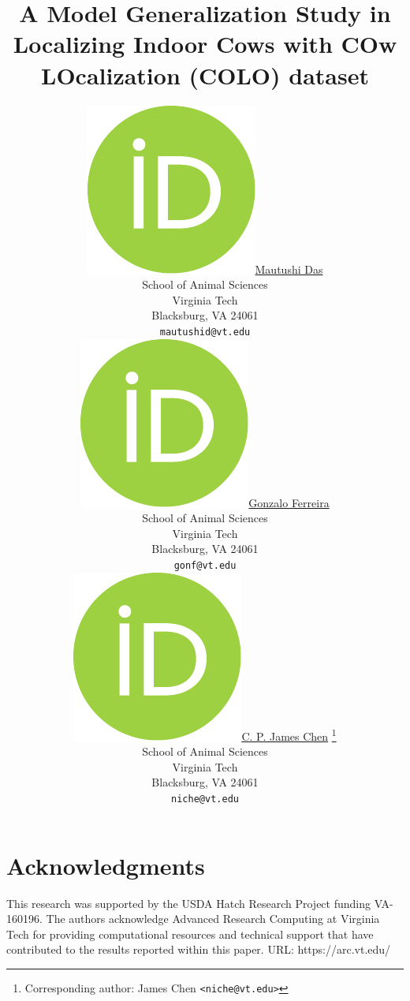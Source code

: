 \documentclass{article}
\title{A Model Generalization Study in Localizing Indoor Cows with COw LOcalization (COLO) dataset}
\author{
    \href{https://orcid.org/0009-0001-8932-142X}{\includegraphics[scale=0.06]{orcid.pdf}\hspace{1mm}Mautushi Das} \\
	School of Animal Sciences\\
	Virginia Tech\\
	Blacksburg, VA 24061 \\
	\texttt{mautushid@vt.edu} \\
	\And
    \href{https://orcid.org/0000-0002-8254-8090}{\includegraphics[scale=0.06]{orcid.pdf}\hspace{1mm}Gonzalo Ferreira} \\
	School of Animal Sciences\\
	Virginia Tech\\
	Blacksburg, VA 24061 \\
	\texttt{gonf@vt.edu} \\
	\And
	\href{https://orcid.org/0000-0002-2018-0702}{\includegraphics[scale=0.06]{orcid.pdf}\hspace{1mm}C. P. James Chen} \thanks{Corresponding author: James Chen \texttt{<niche@vt.edu>}}\\
	School of Animal Sciences\\
	Virginia Tech\\
	Blacksburg, VA 24061 \\
	\texttt{niche@vt.edu}
}
\begin{document}
\maketitle


\newpage




\section*{Acknowledgments}

This research was supported by the USDA Hatch Research Project funding VA-160196. The authors acknowledge Advanced Research Computing at Virginia Tech for providing computational resources and technical support that have contributed to the results reported within this paper. URL: https://arc.vt.edu/

\newpage




\newpage


\end{document}
